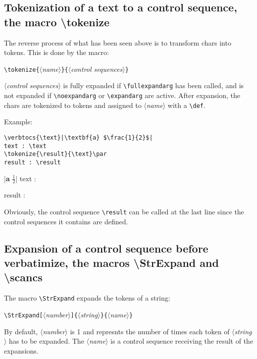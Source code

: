 \documentclass[a4paper,10pt]{article}
\newcommand\argu[1]{$\langle$\textit{#1}$\rangle$}
\newcommand\ARGU[1]{\texttt{\{}\argu{#1}\texttt{\}}}
\newcommand\arguC[1]{\texttt{[}\argu{#1}\texttt{]}}
\newcommand\styleexercice{\footnotesize}
\newcommand\verbinline{\lstinline[basicstyle=\normalsize\ttfamily]}
\begin{document}
\subsection{Tokenization of a text to a control sequence, the macro \ttfamily\textbackslash tokenize}
The reverse process of what has been seen above is to transform chars into tokens. This is done by the macro:\par\nobreak\medskip
\hfill\verbinline|\tokenize|\ARGU{name}\ARGU{control sequences}\hfill{}
\smallskip

\argu{control sequences} is fully expanded if \verbinline|\fullexpandarg| has been called, and is not expanded if \verbinline|\noexpandarg| or \verbinline|\expandarg| are active. After expansion, the chars are tokenized to tokens and assigned to \argu{name} with a \verbinline|\def|.\medskip

Example:\par\nobreak\medskip
\begin{minipage}[c]{0.65\linewidth}
\begin{lstlisting}
\verbtocs{\text}|\textbf{a} $\frac{1}{2}$|
text : \text
\tokenize{\result}{\text}\par
result : \result
\end{lstlisting}%
\end{minipage}\hfill
\begin{minipage}[c]{0.35\linewidth}
	\styleexercice
	\verbtocs{\text}
	  |\textbf{a} $\frac{1}{2}$|
	text : \text
	\tokenize{\result}{\text}	\par
	result : \result
\end{minipage}%
\medskip

Obviously, the control sequence \verb|\result| can be called at the last line since the control sequences it contains are defined.

\subsection{Expansion of a control sequence before verbatimize, the macros {\ttfamily\textbackslash StrExpand} and {\ttfamily\textbackslash scancs}}
\label{scancs}
The macro \verbinline|\StrExpand| expands the tokens of a string:\par\nobreak\medskip
\verbinline|\StrExpand|\arguC{number}\ARGU{string}\ARGU{name}\smallskip

By default, \argu{number} is 1 and represnts the number of times each token of \argu{string} has to be expanded. The \argu{name} is a control sequence receiving the result of the expansions.\medskip
\end{document}
